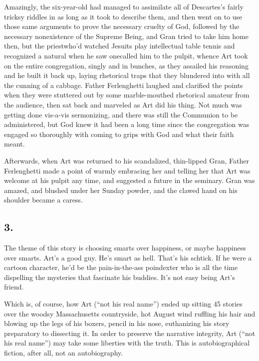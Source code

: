 Amazingly, the six-year-old had managed to assimilate all of
Descartes’s fairly tricksy riddles in as long as it took to
describe them, and then went on to use those same arguments to
prove the necessary cruelty of God, followed by the necessary
nonexistence of the Supreme Being, and Gran tried to take him home
then, but the priest{\dash}who’d watched Jesuits play intellectual table
tennis and recognized a natural when he saw one{\dash}called him to the
pulpit, whence Art took on the entire congregation, singly and in
bunches, as they assailed his reasoning and he built it back up,
laying rhetorical traps that they blundered into with all the
cunning of a cabbage. Father Ferlenghetti laughed and clarified the
points when they were stuttered out by some marble-mouthed
rhetorical amateur from the audience, then sat back and marveled as
Art did his thing. Not much was getting done vis-a-vis sermonizing,
and there was still the Communion to be administered, but God knew
it had been a long time since the congregation was engaged so
thoroughly with coming to grips with God and what their faith
meant.

Afterwards, when Art was returned to his scandalized, thin-lipped
Gran, Father Ferlenghetti made a point of warmly embracing her and
telling her that Art was welcome at his pulpit any time, and
suggested a future in the seminary. Gran was amazed, and blushed
under her Sunday powder, and the clawed hand on his shoulder became
a caress.

\subsection{3.}

The theme of this story is choosing smarts over happiness, or maybe
happiness over smarts. Art’s a good guy. He’s smart as hell. That’s
his schtick. If he were a cartoon character, he’d be the
pain-in-the-ass poindexter who is all the time dispelling the
mysteries that fascinate his buddies. It’s not easy being Art’s
friend.

Which is, of course, how Art (“not his real name”) ended up sitting
45 stories over the woodsy Massachusetts countryside, hot August
wind ruffling his hair and blowing up the legs of his boxers,
pencil in his nose, euthanizing his story preparatory to dissecting
it. In order to preserve the narrative integrity, Art (“not his
real name”) may take some liberties with the truth. This is
autobiographical fiction, after all, not an autobiography.


